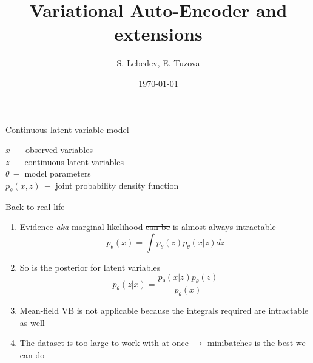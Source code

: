 \documentclass[unicode,11pt]{beamer}
\title{Variational Auto-Encoder and extensions}
\author{S. Lebedev, E. Tuzova}
\institute{JetBrains}
\date{\today}
\begin{document}
\begin{frame}
  \maketitle
\end{frame}

\begin{frame}[fragile]{Continuous latent variable model}
  \begin{center}
  \end{center}

  $x~-$ observed variables\\
  $z~-$ continuous latent variables\\
  $\theta~-$ model parameters\\
  $p_{\theta}(x, z)~-$ joint probability density function\\

\end{frame}

\begin{frame}[fragile]{Back to real life}
	\begin{enumerate}
    \item Evidence \emph{aka} marginal likelihood \sout{can be} is almost always
      intractable
      $$
      p_{\theta}(x) = \int {p_{\theta}(z) p_{\theta}(x|z) dz}
      $$
    \item So is the posterior for latent variables
      $$
      p_{\theta}(z|x) = \frac{p_{\theta}(x|z) p_{\theta}(z)}{p_{\theta}(x)}
      $$
    \item Mean-field VB is not applicable because the integrals required are
      intractable as well
    \item The dataset is too large to work with at once $\rightarrow$
      minibatches is the best we can do
    \end{enumerate}
\end{frame}
\end{document}
